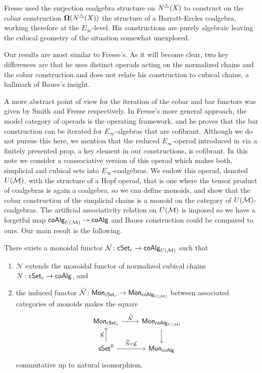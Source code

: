 Fresse \cite{Fresse03construction} used the surjection coalgebra structure on $N^{\triangle}(X)$ to construct on the cobar construction $\mathbf{\Omega}(N^{\triangle}(X))$ the  structure of a Barratt-Eccles coalgebra, working therefore at the $E_\infty$-level. His constructions are purely algebraic leaving the cubical geometry of the situation somewhat unexplored.

Our results are most similar to Fresse's.
As it will become clear, two key differences are that he uses distinct operads acting on the normalized chains and the cobar construction and does not relate his construction to cubical chains, a hallmark of Baues's insight.

A more abstract point of view for the iteration of the cobar and bar functors was given by Smith \cite{Smith94cobar} and Fresse \cite{Fresse10complex} respectively. 
In Fresse's more general approach, the model category of operads is the operating framework, and he proves that the bar construction can be iterated for $E_\infty$-algebras that are cofibrant. Although we do not pursue this here, we mention that the reduced $E_\infty$-operad introduced in \cite{Medina20prop1} via a finitely presented prop, a key element in our constructions, is cofibrant.
In this note we consider a coassociative version of this operad which makes both, simplicial and cubical sets into $E_\infty$-coalgebras.
We endow this operad, denoted $U(\mathcal{M})$, with the structure of a Hopf operad, that is one where the tensor product of coalgebras is again a coalgebra, so we can define monoids, and show that the cobar construction of the simplicial chains is a monoid on the category of $U(\mathcal{M})$-coalgebras.
The artificial associativity relation on $U(\mathcal{M})$ is imposed so we have a forgetful map $\mathsf{coAlg}_{U(\mathcal{M})} \to \mathsf{coAlg}$ and Baues construction could be compared to ours. Our main result is the following.

\begin{theorem}
There exists a monoidal functor $\mathcal{N} \colon \mathsf{cSet}_c \to \mathsf{coAlg}_{U(\mathcal{M})}$ such that

\begin{enumerate}

\item $\mathcal{N}$ extends the monoidal functor of normalized cubical chains $N: \mathsf{cSet}_c \to \mathsf{coAlg}$, and 
\item the induced functor $\widetilde{\mathcal{N}} \colon \mathsf{Mon}_{\mathsf{cSet}_c} \to \mathsf{Mon}_{\mathsf{coAlg}_{U(\mathcal{M})}}$ between associated categories of monoids makes the square
\begin{equation*}
\begin{tikzcd}
\Mon_{\cSet_c} \arrow[r, "\widetilde{\mathcal{N}}"] & \Mon_{\coAlg_{U(\M)}} \arrow[d]\\
\sSet^0 \arrow[r, "\widetilde{N} \circ \gcobar"] \arrow[u, "\gcobar"] & \Mon_{\coAlg}
\end{tikzcd}
\end{equation*}
commutative up to natural isomorphism. 
\end{enumerate}
\end{theorem} 

